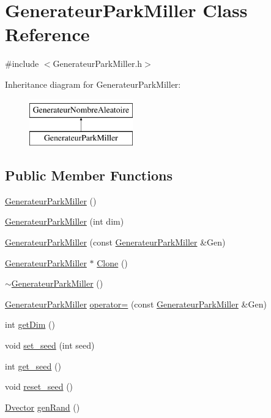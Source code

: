\hypertarget{classGenerateurParkMiller}{\section{Generateur\-Park\-Miller Class Reference}
\label{classGenerateurParkMiller}
}


{\ttfamily \#include $<$Generateur\-Park\-Miller.\-h$>$}

Inheritance diagram for Generateur\-Park\-Miller\-:\begin{figure}[H]
\begin{center}
\leavevmode
\includegraphics[height=2.000000cm]{classGenerateurParkMiller}
\end{center}
\end{figure}
\subsection*{Public Member Functions}
\begin{DoxyCompactItemize}
\item 
\hyperlink{classGenerateurParkMiller_a2fec69afe653b06bbea83ec62fbc5182}{Generateur\-Park\-Miller} ()
\item 
\hyperlink{classGenerateurParkMiller_ad71ea766644eb16e8ea11266ab989896}{Generateur\-Park\-Miller} (int dim)
\item 
\hyperlink{classGenerateurParkMiller_a70ceea9c05917df31cfa441e4b1ec076}{Generateur\-Park\-Miller} (const \hyperlink{classGenerateurParkMiller}{Generateur\-Park\-Miller} \&Gen)
\item 
\hyperlink{classGenerateurParkMiller}{Generateur\-Park\-Miller} $\ast$ \hyperlink{classGenerateurParkMiller_a84bd4dac445c2497e524ccc53a0333ac}{Clone} ()
\item 
\hyperlink{classGenerateurParkMiller_a6268a6b87c5dbc9652faa4b904cb82b5}{$\sim$\-Generateur\-Park\-Miller} ()
\item 
\hyperlink{classGenerateurParkMiller}{Generateur\-Park\-Miller} \hyperlink{classGenerateurParkMiller_ac7a10503745ddd060ef9c50d8dfaed79}{operator=} (const \hyperlink{classGenerateurParkMiller}{Generateur\-Park\-Miller} \&Gen)
\item 
int \hyperlink{classGenerateurParkMiller_a612cd197d36ff3fc2d8bef208f2ce5af}{get\-Dim} ()
\item 
void \hyperlink{classGenerateurParkMiller_ab011b6768425cf54d479ae82d188feb2}{set\-\_\-seed} (int seed)
\item 
int \hyperlink{classGenerateurParkMiller_a1b46d0c00bf5168e80b5f55f69ccdddb}{get\-\_\-seed} ()
\item 
void \hyperlink{classGenerateurParkMiller_a1c9cd0cd2a9ead72a3f20a83f25b7a67}{reset\-\_\-seed} ()
\item 
\hyperlink{classDvector}{Dvector} \hyperlink{classGenerateurParkMiller_a0bdd0f3185e1ee49f5d722f1dea59e2d}{gen\-Rand} ()
\end{DoxyCompactItemize}


